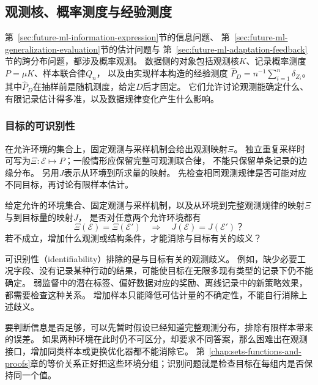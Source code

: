 \subsection{观测核、概率测度与经验测度}
\label{sec:future-data-law-object-map}
\label{sec:future-information-proxy-map}
\label{sec:future-transfer-theory-map}
\label{sec:future-reliability-map}
\label{sec:future-fairness-alignment-interpretation-map}

第~\ref{sec:future-ml-information-expression}节的信息问题、
第~\ref{sec:future-ml-generalization-evaluation}节的估计问题与
第~\ref{sec:future-ml-adaptation-feedback}节的跨分布问题，都涉及概率观测。
数据侧的对象包括观测核$K$、记录概率测度$P=\mu K$、样本联合律$Q_n$，
以及由实现样本构造的经验测度
$\widehat P_D=n^{-1}\sum_{i=1}^n\delta_{Z_i}$。
其中$\widehat P_D$在抽样前是随机测度，给定$D$后才固定。
它们允许讨论观测能确定什么、有限记录估计得多准，以及数据规律变化产生什么影响。

\subsubsection{目标的可识别性}
\label{sec:future-analysis-identification}

在允许环境的集合上，固定观测与采样机制会给出观测映射$\Xi$。
独立重复采样时可写为$\Xi:\mathcal E\mapsto P$；一般情形应保留完整可观测联合律，
不能只保留单条记录的边缘分布。
另用$J$表示从环境到所求量的映射。
先检查相同观测规律是否可能对应不同目标，再讨论有限样本估计。

\begin{mathproblem}[可观测规律是否确定所求量]
  \label{question:future-identification}
  给定允许的环境集合、固定观测与采样机制，以及从环境到完整观测规律的映射$\Xi$
  与到目标量的映射$J$，
  是否对任意两个允许环境都有
  \[
    \Xi(\mathcal E)=\Xi(\mathcal E')
    \quad\Longrightarrow\quad
    J(\mathcal E)=J(\mathcal E')\text{？}
  \]
  若不成立，增加什么观测或结构条件，才能消除与目标有关的歧义？
\end{mathproblem}

可识别性（identifiability）排除的是与目标有关的观测歧义。
例如，缺少必要工况字段、没有记录某种行动的结果，可能使目标在无限多现有类型的记录下仍不能确定。
弱监督中的潜在标签、偏好数据对应的奖励、离线记录中的新策略效果，都需要检查这种关系。
增加样本只能降低可估计量的不确定性，不能自行消除上述歧义。

要判断信息是否足够，可以先暂时假设已经知道完整观测分布，排除有限样本带来的误差。
如果两种环境在此时仍不可区分，却要求不同答案，那么困难出在观测接口，增加同类样本或更换优化器都不能消除它。
第~\ref{chap:sets-functions-and-proofs}章的等价关系正好把这些环境分组；识别问题就是检查目标在每组内是否保持同一个值。


